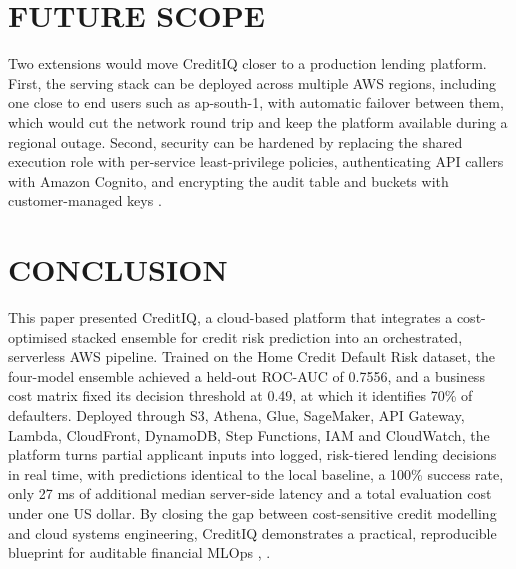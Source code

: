 \documentclass[conference]{IEEEtran}
\begin{document}
\section{FUTURE SCOPE}
Two extensions would move CreditIQ closer to a production lending platform. First, the serving stack can be deployed across multiple AWS regions, including one close to end users such as ap-south-1, with automatic failover between them, which would cut the network round trip and keep the platform available during a regional outage. Second, security can be hardened by replacing the shared execution role with per-service least-privilege policies, authenticating API callers with Amazon Cognito, and encrypting the audit table and buckets with customer-managed keys \cite{12}.

\section{CONCLUSION}
This paper presented CreditIQ, a cloud-based platform that integrates a cost-optimised stacked ensemble for credit risk prediction into an orchestrated, serverless AWS pipeline. Trained on the Home Credit Default Risk dataset, the four-model ensemble achieved a held-out ROC-AUC of 0.7556, and a business cost matrix fixed its decision threshold at 0.49, at which it identifies 70\% of defaulters. Deployed through S3, Athena, Glue, SageMaker, API Gateway, Lambda, CloudFront, DynamoDB, Step Functions, IAM and CloudWatch, the platform turns partial applicant inputs into logged, risk-tiered lending decisions in real time, with predictions identical to the local baseline, a 100\% success rate, only 27 ms of additional median server-side latency and a total evaluation cost under one US dollar. By closing the gap between cost-sensitive credit modelling and cloud systems engineering, CreditIQ demonstrates a practical, reproducible blueprint for auditable financial MLOps \cite{2}, \cite{6}.
\end{document}
